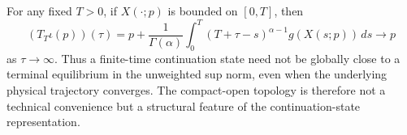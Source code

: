 \begin{remark}
\label{rem:tail-anchoring}
For any fixed \(T>0\), if \(X(\cdot;p)\) is bounded on \([0,T]\), then
\[
  (T_T\iota(p))(\tau)
  =
  p+
  \frac{1}{\Gamma(\alpha)}
  \int_0^T
  (T+\tau-s)^{\alpha-1}g(X(s;p))\,ds
  \to p
\]
as \(\tau\to\infty\). Thus a finite-time continuation state need not be globally close to a terminal equilibrium in the unweighted sup norm, even when the underlying physical trajectory converges. The compact-open topology is therefore not a technical convenience but a structural feature of the continuation-state representation.
\end{remark}
